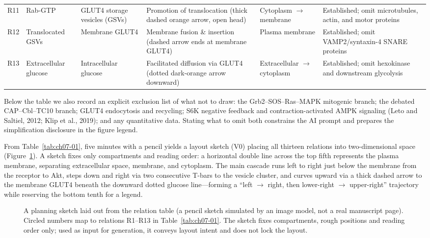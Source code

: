 \begin{table}[htbp]
\begin{tabularx}{\linewidth}{lYYYYY}
R11 & Rab-GTP & GLUT4 storage vesicles (GSVs) & Promotion of translocation (thick dashed orange arrow, open head) & Cytoplasm $\rightarrow$ membrane & Established; omit microtubules, actin, and motor proteins \\
R12 & Translocated GSVs & Membrane GLUT4 & Membrane fusion \& insertion (dashed arrow ends at membrane GLUT4) & Plasma membrane & Established; omit VAMP2/syntaxin-4 SNARE proteins \\
R13 & Extracellular glucose & Intracellular glucose & Facilitated diffusion via GLUT4 (dotted dark-orange arrow downward) & Extracellular $\rightarrow$ cytoplasm & Established; omit hexokinase and downstream glycolysis \\
\bottomrule
\end{tabularx}
\end{table}

Below the table we also record an explicit exclusion list of what not to draw: the Grb2--SOS--Ras--MAPK mitogenic branch; the debated CAP--Cbl--TC10 branch; GLUT4 endocytosis and recycling; S6K negative feedback and contraction-activated AMPK signaling (Leto and Saltiel, 2012; Klip et al., 2019); and any quantitative data. Stating what to omit both constrains the AI prompt and prepares the simplification disclosure in the figure legend.

From Table~\ref{tab:ch07-01}, five minutes with a pencil yields a layout sketch (V0) placing all thirteen relations into two-dimensional space (Figure~\ref{fig:ch07-02}). A sketch fixes only compartments and reading order: a horizontal double line across the top fifth represents the plasma membrane, separating extracellular space, membrane, and cytoplasm. The main cascade runs left to right just below the membrane from the receptor to Akt, steps down and right via two consecutive T-bars to the vesicle cluster, and curves upward via a thick dashed arrow to the membrane GLUT4 beneath the downward dotted glucose line---forming a ``left $\rightarrow$ right, then lower-right $\rightarrow$ upper-right'' trajectory while reserving the bottom tenth for a legend.

\begin{figure}[htbp]\centering

\caption{A planning sketch laid out from the relation table (a pencil sketch simulated by an image model, not a real manuscript page). Circled numbers map to relations R1--R13 in Table~\ref{tab:ch07-01}. The sketch fixes compartments, rough positions and reading order only; used as input for generation, it conveys layout intent and does not lock the layout.}\label{fig:ch07-02}
\end{figure}

